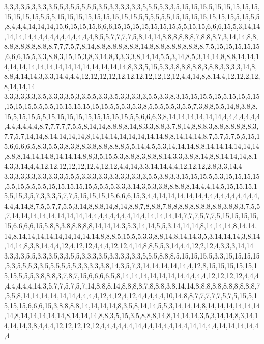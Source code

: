 3,3,3,3,5,3,3,3,3,5,5,3,5,5,5,5,5,3,5,3,3,3,3,3,3,5,5,5,5,3,3,5,15,15,15,5,15,15,15,15,15,15,15,15,15,5,5,5,15,15,15,15,15,15,15,15,15,5,5,5,5,5,5,15,15,15,15,15,15,15,5,15,5,5,8,4,4,4,14,14,14,15,6,15,15,15,6,6,6,15,15,15,15,15,15,15,5,5,15,15,6,6,6,15,5,3,14,14,14,14,14,4,4,4,4,4,4,4,4,4,4,4,8,5,5,7,7,7,7,5,8,14,14,8,8,8,8,8,8,7,8,8,8,7,3,14,14,8,8,8,8,8,8,8,8,8,8,8,7,7,7,5,7,8,14,8,8,8,8,8,8,8,8,14,8,8,8,8,8,8,8,8,8,8,7,5,15,15,15,15,15,6,6,6,15,5,3,3,8,8,3,15,15,3,8,3,14,8,3,3,3,3,8,14,14,5,5,3,14,8,5,3,14,14,8,8,8,14,14,14,14,14,14,14,14,14,14,14,14,14,14,14,14,8,3,3,5,15,5,3,3,8,8,8,8,8,3,8,8,3,3,3,3,14,8,8,8,4,14,14,3,3,3,14,4,4,4,12,12,12,12,12,12,12,12,12,12,12,4,4,14,8,8,14,4,12,12,2,12,8,14,14,14
3,3,3,3,3,3,3,5,3,3,3,3,5,3,3,5,5,3,3,3,5,3,3,3,3,3,5,5,3,3,8,3,15,15,15,5,15,5,15,15,5,15,15,15,15,5,5,5,5,15,15,15,15,15,15,5,5,5,3,5,3,8,5,5,5,5,5,3,5,5,7,3,8,8,5,5,14,8,3,8,8,15,5,15,15,5,5,15,15,15,15,15,15,15,15,15,5,5,6,6,6,3,8,14,14,14,14,14,14,4,4,4,4,4,4,4,4,4,4,4,4,4,8,7,7,7,7,7,5,5,8,14,14,8,8,8,8,14,8,3,3,8,8,3,7,8,14,8,8,8,3,8,8,8,8,8,8,8,3,7,7,5,7,14,14,8,14,14,14,14,8,14,14,14,14,14,14,14,14,8,8,14,14,14,8,7,5,7,5,7,5,5,15,15,6,6,6,6,5,8,3,5,5,3,8,3,8,8,3,8,8,8,8,8,8,5,5,14,4,5,5,3,14,14,14,8,8,14,14,14,14,14,14,8,8,8,14,14,14,8,14,14,14,8,8,3,5,15,5,3,8,8,8,3,8,8,8,14,3,3,3,8,8,14,8,8,14,14,14,8,14,3,3,14,4,4,12,12,12,12,12,12,4,12,12,4,4,14,3,3,14,14,4,4,12,12,12,2,8,3,3,14,4
3,3,3,3,3,3,3,3,3,3,3,5,5,5,3,3,3,3,3,3,3,3,3,3,3,3,5,5,3,8,3,3,15,15,15,5,5,3,15,15,15,15,5,5,15,5,5,5,5,15,15,15,15,15,5,5,5,5,3,3,3,14,3,5,3,3,8,8,8,8,8,14,4,4,14,5,15,15,15,15,5,15,3,5,7,3,3,3,5,7,7,5,15,15,15,15,6,6,6,15,3,4,4,14,14,14,14,14,4,4,4,4,4,4,4,4,4,4,4,4,4,14,8,7,5,5,7,7,5,5,3,14,8,8,8,14,8,14,8,8,7,8,8,8,7,8,8,8,8,8,8,8,8,8,8,3,8,8,3,7,5,5,7,14,14,14,14,14,14,14,14,14,4,4,4,4,4,4,4,14,4,14,14,14,14,7,7,7,5,7,7,5,15,15,15,15,15,6,6,6,6,15,5,8,8,3,8,8,8,8,8,14,14,14,3,5,3,14,14,5,5,3,14,14,14,8,14,14,14,8,14,14,14,8,14,14,14,14,14,14,14,14,14,8,8,8,5,15,5,5,3,3,8,8,14,8,14,14,3,5,3,14,14,14,3,8,14,14,14,8,3,8,14,4,4,12,4,12,12,4,4,4,12,12,4,14,8,8,5,5,3,14,4,4,12,2,12,4,3,3,3,14,14
3,3,3,3,5,5,3,3,3,5,3,3,5,5,3,3,3,3,5,3,3,3,3,3,3,5,5,5,8,8,8,5,15,15,15,5,3,3,15,15,15,15,5,3,5,5,5,3,3,5,5,5,5,5,5,3,3,3,3,3,8,14,3,5,7,3,14,14,14,14,14,4,12,8,15,15,15,15,15,15,15,5,5,5,3,8,8,8,3,7,8,7,15,6,6,6,6,5,8,14,14,14,14,14,14,14,4,4,4,4,12,12,12,12,4,4,4,4,4,4,4,4,14,3,5,7,7,5,7,5,7,14,8,8,8,14,8,8,8,8,7,8,8,8,3,8,14,14,8,8,8,8,8,8,8,8,8,8,8,7,5,5,8,14,14,14,14,14,14,4,4,4,4,12,4,12,4,12,4,4,4,4,4,10,14,8,8,7,7,7,7,7,5,7,5,15,5,15,15,15,6,6,6,15,3,8,8,8,8,14,14,14,14,8,3,5,8,14,14,5,5,3,14,14,14,8,14,14,14,14,14,14,14,8,14,14,14,14,14,8,14,14,14,8,8,3,5,15,3,5,8,8,8,14,8,14,14,14,3,5,3,14,14,8,3,14,14,14,14,3,8,4,4,4,12,12,12,12,12,4,4,4,4,4,4,14,4,4,14,4,4,14,4,14,14,4,4,14,14,14,14,4,4
